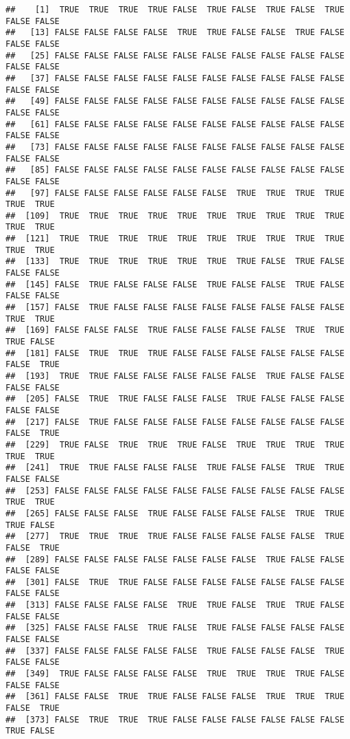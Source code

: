 \documentclass[
]{article}
\begin{document}
\begin{verbatim}
##    [1]  TRUE  TRUE  TRUE  TRUE FALSE  TRUE FALSE  TRUE FALSE  TRUE FALSE FALSE
##   [13] FALSE FALSE FALSE FALSE  TRUE  TRUE FALSE FALSE  TRUE FALSE FALSE FALSE
##   [25] FALSE FALSE FALSE FALSE FALSE FALSE FALSE FALSE FALSE FALSE FALSE FALSE
##   [37] FALSE FALSE FALSE FALSE FALSE FALSE FALSE FALSE FALSE FALSE FALSE FALSE
##   [49] FALSE FALSE FALSE FALSE FALSE FALSE FALSE FALSE FALSE FALSE FALSE FALSE
##   [61] FALSE FALSE FALSE FALSE FALSE FALSE FALSE FALSE FALSE FALSE FALSE FALSE
##   [73] FALSE FALSE FALSE FALSE FALSE FALSE FALSE FALSE FALSE FALSE FALSE FALSE
##   [85] FALSE FALSE FALSE FALSE FALSE FALSE FALSE FALSE FALSE FALSE FALSE FALSE
##   [97] FALSE FALSE FALSE FALSE FALSE FALSE  TRUE  TRUE  TRUE  TRUE  TRUE  TRUE
##  [109]  TRUE  TRUE  TRUE  TRUE  TRUE  TRUE  TRUE  TRUE  TRUE  TRUE  TRUE  TRUE
##  [121]  TRUE  TRUE  TRUE  TRUE  TRUE  TRUE  TRUE  TRUE  TRUE  TRUE  TRUE  TRUE
##  [133]  TRUE  TRUE  TRUE  TRUE  TRUE  TRUE  TRUE FALSE  TRUE FALSE FALSE FALSE
##  [145] FALSE  TRUE FALSE FALSE FALSE  TRUE FALSE FALSE  TRUE FALSE FALSE FALSE
##  [157] FALSE  TRUE FALSE FALSE FALSE FALSE FALSE FALSE FALSE FALSE  TRUE  TRUE
##  [169] FALSE FALSE FALSE  TRUE FALSE FALSE FALSE FALSE  TRUE  TRUE  TRUE FALSE
##  [181] FALSE  TRUE  TRUE  TRUE FALSE FALSE FALSE FALSE FALSE FALSE FALSE  TRUE
##  [193]  TRUE  TRUE FALSE FALSE FALSE FALSE FALSE  TRUE FALSE FALSE FALSE FALSE
##  [205] FALSE  TRUE  TRUE FALSE FALSE FALSE  TRUE FALSE FALSE FALSE FALSE FALSE
##  [217] FALSE  TRUE FALSE FALSE FALSE FALSE FALSE FALSE FALSE FALSE FALSE  TRUE
##  [229]  TRUE FALSE  TRUE  TRUE  TRUE FALSE  TRUE  TRUE  TRUE  TRUE  TRUE  TRUE
##  [241]  TRUE  TRUE FALSE FALSE FALSE  TRUE FALSE FALSE  TRUE  TRUE FALSE FALSE
##  [253] FALSE FALSE FALSE FALSE FALSE FALSE FALSE FALSE FALSE FALSE  TRUE  TRUE
##  [265] FALSE FALSE FALSE  TRUE FALSE FALSE FALSE FALSE  TRUE  TRUE  TRUE FALSE
##  [277]  TRUE  TRUE  TRUE  TRUE FALSE FALSE FALSE FALSE FALSE  TRUE FALSE  TRUE
##  [289] FALSE FALSE FALSE FALSE FALSE FALSE FALSE  TRUE FALSE FALSE FALSE FALSE
##  [301] FALSE  TRUE  TRUE FALSE FALSE FALSE FALSE FALSE FALSE FALSE FALSE FALSE
##  [313] FALSE FALSE FALSE FALSE  TRUE  TRUE FALSE  TRUE  TRUE FALSE FALSE FALSE
##  [325] FALSE FALSE FALSE  TRUE FALSE  TRUE FALSE FALSE FALSE FALSE FALSE FALSE
##  [337] FALSE FALSE FALSE FALSE FALSE  TRUE FALSE FALSE FALSE  TRUE FALSE FALSE
##  [349]  TRUE FALSE FALSE FALSE FALSE  TRUE  TRUE  TRUE  TRUE FALSE FALSE FALSE
##  [361] FALSE FALSE  TRUE  TRUE FALSE FALSE FALSE  TRUE  TRUE  TRUE FALSE  TRUE
##  [373] FALSE  TRUE  TRUE  TRUE FALSE FALSE FALSE FALSE FALSE FALSE  TRUE FALSE

\end{verbatim}
\end{document}
